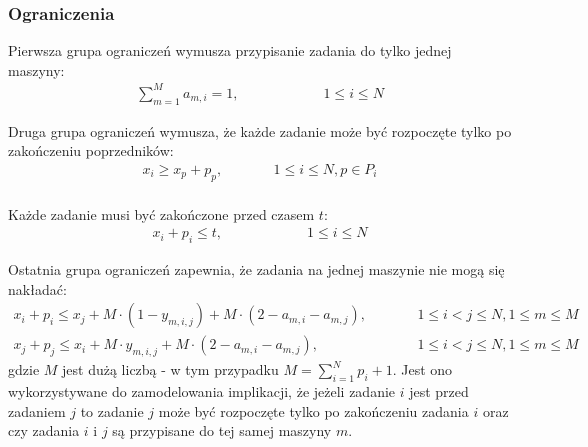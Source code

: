 \documentclass{article}
\begin{document}
\subsubsection{Ograniczenia}
Pierwsza grupa ograniczeń wymusza przypisanie zadania do tylko jednej maszyny:
\begin{align*}
    \sum_{m=1}^{M} a_{m,i} = 1, \qquad \qquad \qquad 1 \leq i \leq N
\end{align*}

Druga grupa ograniczeń wymusza, że każde zadanie może być rozpoczęte tylko po zakończeniu poprzedników:
\begin{align*}
    x_i \geq x_p + p_p, \qquad &&1 \leq i \leq N, p \in P_i \\
\end{align*}

Każde zadanie musi być zakończone przed czasem $t$:
\begin{align*}
    x_i + p_i \leq t, \qquad \qquad \qquad 1 \leq i \leq N
\end{align*}

Ostatnia grupa ograniczeń zapewnia, że zadania na jednej maszynie nie mogą się nakładać:
\begin{align*}
    x_i + p_i \leq x_j + M \cdot (1 - y_{m,i,j}) + M \cdot (2 - a_{m,i} - a_{m,j}), \qquad &&1 \leq i<j \leq N, 1 \leq m \leq M \\
    x_j + p_j \leq x_i + M \cdot y_{m,i,j} + M \cdot (2 - a_{m,i} - a_{m,j}), \qquad &&1 \leq i<j \leq N, 1 \leq m \leq M
\end{align*}
gdzie $M$ jest dużą liczbą - w tym przypadku $ \displaystyle M = \sum_{i=1}^{N} p_i + 1$.
Jest ono wykorzystywane do zamodelowania implikacji, że jeżeli zadanie $i$ jest przed zadaniem $j$ to zadanie $j$ może być rozpoczęte tylko po zakończeniu zadania $i$ oraz czy zadania $i$ i $j$ są przypisane do tej samej maszyny $m$.
\end{document}
